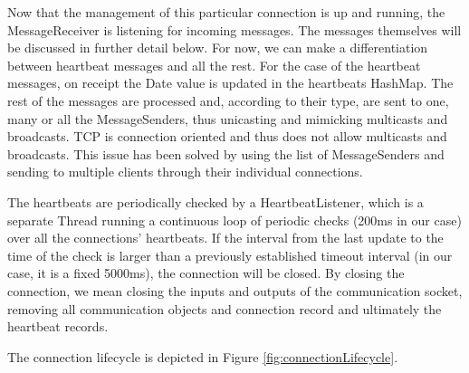 Now that the management of this particular connection is up and running, the
MessageReceiver is listening for incoming messages. The messages themselves will
be discussed in further detail below. For now, we can make a differentiation
between heartbeat messages and all the rest. For the case of the heartbeat
messages, on receipt the Date value is updated in the heartbeats HashMap. The
rest of the messages are processed and, according to their type, are sent to
one, many or all the MessageSenders, thus unicasting and mimicking multicasts
and broadcasts. TCP is connection oriented and thus does not allow multicasts
and broadcasts. This issue has been solved by using the list of MessageSenders
and sending to multiple clients through their individual connections.\newline

The heartbeats are periodically checked by a HeartbeatListener, which is a
separate Thread running a continuous loop of periodic checks (200ms in our
case) over all the connections' heartbeats. If the interval from the last update
to the time of the check is larger than a previously established timeout
interval (in our case, it is a fixed 5000ms), the connection will be closed. By
closing the connection, we mean closing the inputs and outputs of the
communication socket, removing all communication objects and connection
record and ultimately the heartbeat records.\newline

The connection lifecycle is depicted in Figure \ref{fig:connectionLifecycle}.

